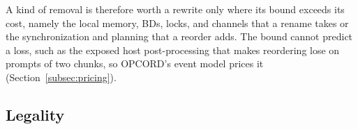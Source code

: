 
A kind of removal is therefore worth a rewrite only where its bound exceeds its cost, namely the local memory, BDs, locks, and channels that a rename takes or the synchronization and planning that a reorder adds.
The bound cannot predict a loss, such as the exposed host post-processing that makes reordering lose on prompts of two chunks, so OPCORD's event model prices it (Section~\ref{subsec:pricing}).

\subsection{Legality}
\label{subsec:legality}

